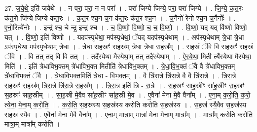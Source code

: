 \documentclass[17pt]{extarticle}
\begin{document}
27. ज॒ये॒थे॒ इति॑ जयेथे । . न परा॒ परा॒ न न परा᳚ । . परा॑ जिग्ये जिग्ये॒ परा॒ परा॑ जिग्ये । . जि॒ग्ये॒ क॒त॒रः क॑त॒रो जि॑ग्ये जिग्ये कत॒रः । . क॒त॒र श्च॒न च॒न क॑त॒रः क॑त॒र श्च॒न । . च॒नैनो॑ रेनो श्च॒न च॒नैनोः᳚ । . ए॒नो॒रित्ये॑नोः । . इन्द्र॑ श्च॒ चे न्द्र॒ इन्द्र॑ श्च । . च॒ वि॒ष्णो॒ वि॒ष्णो॒ च॒ च॒ वि॒ष्णो॒ । . वि॒ष्णो॒ यद् यद् वि॑ष्णो विष्णो॒ यत् । . वि॒ष्णो॒ इति॑ विष्णो । . यदप॑स्पृधेथा॒ मप॑स्पृधेथां॒ ॅयद् यदप॑स्पृधेथाम् । . अप॑स्पृधेथाम् त्रे॒धा त्रे॒धा ऽप॑स्पृधेथा॒ मप॑स्पृधेथाम् त्रे॒धा । . त्रे॒धा स॒हस्रꣳ॑ स॒हस्र॑म् त्रे॒धा त्रे॒धा स॒हस्र᳚म् । . स॒हस्रं॒ ॅवि वि स॒हस्रꣳ॑ स॒हस्रं॒ ॅवि । . वि तत् तद् वि वि तत् । . तदै॑रयेथा मैरयेथा॒म् तत् तदै॑रयेथाम् । . ऐ॒र॒ये॒था॒ मिती त्यै॑रयेथा मैरयेथा॒ मिति॑ । . इति॑ त्रेधाविभ॒क्तम् त्रे॑धाविभ॒क्त मितीति॑ त्रेधाविभ॒क्तम् । . त्रे॒धा॒वि॒भ॒क्तं ॅवै वै त्रे॑धाविभ॒क्तम् त्रे॑धाविभ॒क्तं ॅवै । . त्रे॒धा॒वि॒भ॒क्तमिति॑ त्रेधा - वि॒भ॒क्तम् । . वै त्रि॑रा॒त्रे त्रि॑रा॒त्रे वै वै त्रि॑रा॒त्रे । . त्रि॒रा॒त्रे स॒हस्रꣳ॑ स॒हस्र॑म् त्रिरा॒त्रे त्रि॑रा॒त्रे स॒हस्र᳚म् । . त्रि॒रा॒त्र इति॑ त्रि - रा॒त्रे । . स॒हस्रꣳ॑ साह॒स्रीꣳ सा॑ह॒स्रीꣳ स॒हस्रꣳ॑ स॒हस्रꣳ॑ साह॒स्रीम् । . सा॒ह॒स्री मे॒वैव सा॑ह॒स्रीꣳ सा॑ह॒स्री मे॒व । . ए॒वैना॑ मेना मे॒वै वैना᳚म् । . ए॒ना॒म् क॒रो॒ति॒ क॒रो॒ त्ये॒ना॒ मे॒ना॒म् क॒रो॒ति॒ । . क॒रो॒ति॒ स॒हस्र॑स्य स॒हस्र॑स्य करोति करोति स॒हस्र॑स्य । . स॒हस्र॑ स्यै॒वैव स॒हस्र॑स्य स॒हस्र॑ स्यै॒व । . ए॒वैना॑ मेना मे॒वै वैना᳚म् । . ए॒ना॒म् मात्रा॒म् मात्रा॑ मेना मेना॒म् मात्रा᳚म् । . मात्रा᳚म् करोति करोति॒ मात्रा॒म् मात्रा᳚म् करोति । \newline
\end{document}
